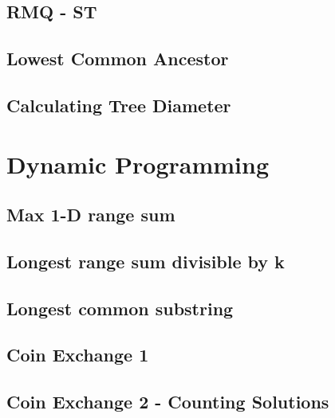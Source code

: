 	\subsection{RMQ - ST}
	\subsection{Lowest Common Ancestor}
	\subsection{Calculating Tree Diameter}


\section{Dynamic Programming}
	\subsection{Max 1-D range sum}
	\subsection{Longest range sum divisible by k}
	\subsection{Longest common substring}
	\subsection{Coin Exchange 1}
	\subsection{Coin Exchange 2 - Counting Solutions}
